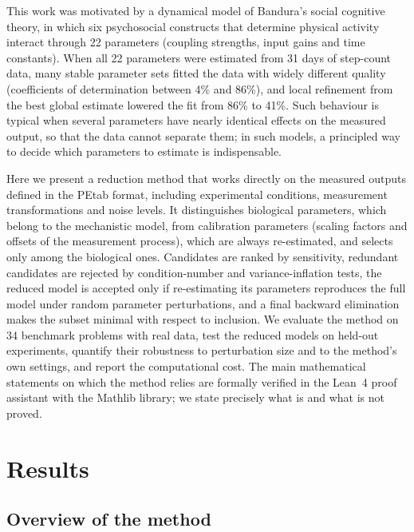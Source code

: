 \documentclass[pdflatex,sn-nature]{sn-jnl}
\theoremstyle{plain}
\begin{document}
This work was motivated by a dynamical model of Bandura's social cognitive theory\cite{bib3,bib34}, in which six psychosocial constructs that determine physical activity interact through 22 parameters (coupling strengths, input gains and time constants). When all 22 parameters were estimated from 31 days of step-count data, many stable parameter sets fitted the data with widely different quality (coefficients of determination between 4\% and 86\%), and local refinement from the best global estimate lowered the fit from 86\% to 41\%\cite{bib35}. Such behaviour is typical when several parameters have nearly identical effects on the measured output, so that the data cannot separate them; in such models, a principled way to decide which parameters to estimate is indispensable.

Here we present a reduction method that works directly on the measured outputs defined in the PEtab format\cite{bib27}, including experimental conditions, measurement transformations and noise levels. It distinguishes biological parameters, which belong to the mechanistic model, from calibration parameters (scaling factors and offsets of the measurement process), which are always re-estimated, and selects only among the biological ones. Candidates are ranked by sensitivity, redundant candidates are rejected by condition-number and variance-inflation tests, the reduced model is accepted only if re-estimating its parameters reproduces the full model under random parameter perturbations, and a final backward elimination makes the subset minimal with respect to inclusion. We evaluate the method on 34 benchmark problems with real data\cite{bib31,bib27}, test the reduced models on held-out experiments, quantify their robustness to perturbation size and to the method's own settings, and report the computational cost. The main mathematical statements on which the method relies are formally verified in the Lean~4 proof assistant with the Mathlib library\cite{bib19,bib21}; we state precisely what is and what is not proved.

\section*{Results}\label{sec:results}

\subsection*{Overview of the method}\label{sec:overview}
\end{document}
